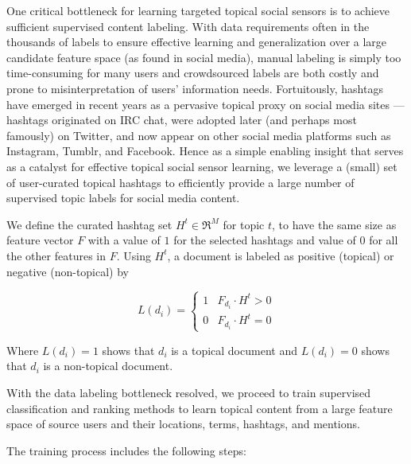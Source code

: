 One critical bottleneck for learning targeted topical social sensors
is to achieve sufficient supervised content labeling.  With data
requirements often in the thousands of labels to ensure effective
learning and generalization over a large candidate feature space (as
found in social media), manual labeling is simply too time-consuming
for many users and crowdsourced labels are both costly and prone to
misinterpretation of users' information needs.  Fortuitously, hashtags
have emerged in recent years as a pervasive topical proxy on social
media sites --- hashtags originated on IRC chat, were adopted later
(and perhaps most famously) on Twitter, and now appear on other social
media platforms such as Instagram, Tumblr, and Facebook.  Hence as a
simple enabling insight that serves as a catalyst for effective
topical social sensor learning, we leverage a (small) set of
user-curated topical hashtags to efficiently provide a large number of
supervised topic labels for social media content.

We define the curated hashtag set $H^{t} \in \Re^{M}$ for topic $t$, to have the same size as feature vector $F$ with a value of $1$ for the selected hashtags and value of $0$ for all the other features in $F$. Using $H^{t}$, a document is labeled as positive (topical) or negative (non-topical) by

\begin{equation}
L(d_{i}) = \left\{\begin{matrix}
1 & F_{d_{i}} \cdot H^{t} > 0  \\ 
0 & F_{d_{i}} \cdot H^{t} = 0
\end{matrix}\right.
\label{eq:labeling}
\end{equation}

Where $L(d_{i}) = 1$ shows that $d_{i}$ is a topical document and $L(d_{i}) = 0$ shows that $d_{i}$ is a non-topical document.

With the data labeling bottleneck resolved, we proceed to train
supervised classification and ranking methods to learn topical content
from a large feature space of source users and their locations, terms,
hashtags, and mentions.

The training process includes the following steps:

